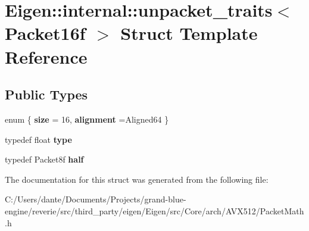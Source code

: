 \hypertarget{struct_eigen_1_1internal_1_1unpacket__traits_3_01_packet16f_01_4}{}\section{Eigen\+::internal\+::unpacket\+\_\+traits$<$ Packet16f $>$ Struct Template Reference}
\label{struct_eigen_1_1internal_1_1unpacket__traits_3_01_packet16f_01_4}
\subsection*{Public Types}
\begin{DoxyCompactItemize}
\item 
\mbox{\label{struct_eigen_1_1internal_1_1unpacket__traits_3_01_packet16f_01_4_a76f3a887ece6ed629e57a9a26939b225}} 
enum \{ {\bfseries size} = 16, 
{\bfseries alignment} =Aligned64
 \}
\item 
\mbox{\label{struct_eigen_1_1internal_1_1unpacket__traits_3_01_packet16f_01_4_a92fc65b0a79e1b15693b0fca253c610f}} 
typedef float {\bfseries type}
\item 
\mbox{\label{struct_eigen_1_1internal_1_1unpacket__traits_3_01_packet16f_01_4_ab7f53faa37c6cc9a8c1f93ee13479dea}} 
typedef Packet8f {\bfseries half}
\end{DoxyCompactItemize}


The documentation for this struct was generated from the following file\+:\begin{DoxyCompactItemize}
\item 
C\+:/\+Users/dante/\+Documents/\+Projects/grand-\/blue-\/engine/reverie/src/third\+\_\+party/eigen/\+Eigen/src/\+Core/arch/\+A\+V\+X512/Packet\+Math.\+h\end{DoxyCompactItemize}
